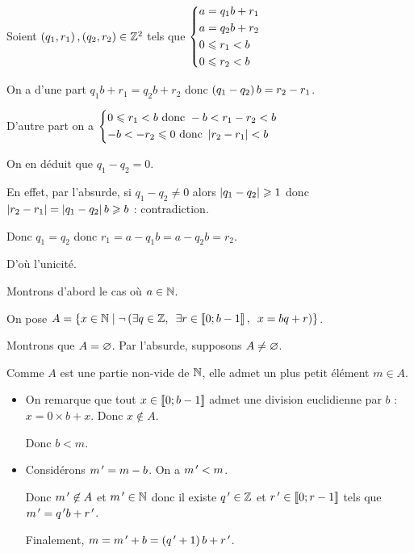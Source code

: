 \begin{dem}
\unicite

Soient \(\paren{q_1,r_1},\paren{q_2,r_2}\in\Z^2\) tels que \(\begin{dcases}
a=q_1b+r_1 \\
a=q_2b+r_2 \\
0\leq r_1<b \\
0\leq r_2<b
\end{dcases}\)

On a d'une part \(q_1b+r_1=q_2b+r_2\) donc \(\paren{q_1-q_2}b=r_2-r_1\).

D'autre part on a \(\begin{dcases}0\leq r_1<b\text{ donc }-b<r_1-r_2<b \\ -b<-r_2\leq0\text{ donc }\abs{r_2-r_1}<b\end{dcases}\)

On en déduit que \(q_1-q_2=0\).

En effet, par l'absurde, si \(q_1-q_2\not=0\) alors \(\abs{q_1-q_2}\geq1\) donc \(\abs{r_2-r_1}=\abs{q_1-q_2}b\geq b\) : contradiction.

Donc \(q_1=q_2\) donc \(r_1=a-q_1b=a-q_2b=r_2\).

D'où l'unicité.

\existence

Montrons d'abord le cas où \(a\in\N\).

On pose \(A=\accol{x\in\N\tq\non\paren{\quantifs{\exists q\in\Z;\exists r\in\interventierii{0}{b-1}}x=bq+r}}\).

Montrons que \(A=\ensvide\). Par l'absurde, supposons \(A\not=\ensvide\).

Comme \(A\) est une partie non-vide de \(\N\), elle admet un plus petit élément \(m\in A\).

\begin{itemize}
\item On remarque que tout \(x\in\interventierii{0}{b-1}\) admet une division euclidienne par \(b\) : \(x=0\times b+x\). Donc \(x\not\in A\).

Donc \(b<m\).

\item Considérons \(m\prim=m-b\). On a \(m\prim<m\).

Donc \(m\prim\not\in A\) et \(m\prim\in\N\) donc il existe \(q\prim\in\Z\) et \(r\prim\in\interventierii{0}{r-1}\) tels que \(m\prim=q\prim b+r\prim\).

Finalement, \(m=m\prim+b=\paren{q\prim+1}b+r\prim\).


\end{itemize}
\end{dem}
